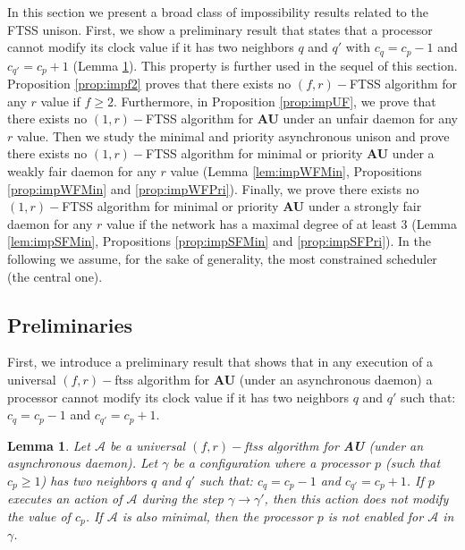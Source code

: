 \documentclass[11pt,english,letterpaper]{article}
\newtheorem{lemma}{Lemma}
\begin{document}
In this section we present a broad class of impossibility results related to the FTSS unison. First, we show a preliminary result that states that a processor cannot modify its clock value if it has two neighbors $q$ and $q'$ with $c_{q}=c_{p}-1$ and $c_{q'}=c_{p}+1$ (Lemma \ref{lem:blocage}). This property is further used in the sequel of this section. Proposition \ref{prop:impf2} proves that there exists no $(f,r)-$FTSS algorithm for any $r$ value if $f\geq2$. Furthermore, in  Proposition \ref{prop:impUF}, we prove that there exists no $(1,r)-$FTSS algorithm for \textbf{AU} under an unfair daemon for any $r$ value. Then we study the minimal and priority asynchronous unison and  prove there exists no $(1,r)-$FTSS algorithm for minimal or priority \textbf{AU} under a weakly fair daemon for any $r$ value (Lemma \ref{lem:impWFMin}, Propositions \ref{prop:impWFMin} and \ref{prop:impWFPri}). Finally, we prove there exists no $(1,r)-$FTSS algorithm for minimal or priority \textbf{AU} under a strongly fair daemon for any $r$ value if the network has a maximal degree of at least 3 (Lemma \ref{lem:impSFMin}, Propositions \ref{prop:impSFMin} and \ref{prop:impSFPri}). In the following we assume, for the sake of generality, the most constrained scheduler (the central one).

\subsection{Preliminaries}

First, we introduce a preliminary result that shows that in any execution of a universal $(f,r)-$ftss algorithm for \textbf{AU} (under an asynchronous daemon) a processor cannot modify its clock value if it has two neighbors $q$ and $q'$ such that: $c_{q}=c_{p}-1$ and $c_{q'}=c_{p}+1$.  

\begin{lemma}\label{lem:blocage}
Let $\mathcal{A}$ be a universal $(f,r)-$ftss algorithm for \textbf{AU} (under an asynchronous daemon). Let $\gamma$ be a configuration where a processor $p$ (such that $c_{p}\geq 1$) has two neighbors $q$ and $q'$ such that: $c_{q}=c_{p}-1$ and $c_{q'}=c_{p}+1$. If $p$ executes an action of $\mathcal{A}$ during the step $\gamma\longrightarrow\gamma'$, then this action does not modify the value of $c_{p}$.   If $\mathcal{A}$ is also minimal, then the processor $p$ is not enabled for $\mathcal{A}$ in $\gamma$.
\end{lemma}
\end{document}
